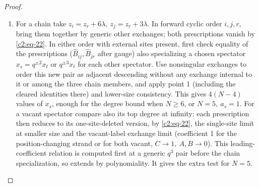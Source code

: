 \begin{proof}
\begin{enumerate}
\item For a chain take \(z_i=z_r+6\lambda,\ z_j=z_r+3\lambda\). In forward cyclic order \(i,j,r\), bring them together by generic other exchanges; both prescriptions vanish by \eqref{c2:eq-22}. In either order with external sites present, first check equality of the prescriptions (\(\widehat B_{ij},\widehat B_{jr}\) after gauge) also specializing a chosen spectator \(x_s=q^{\pm2}x_t\) or \(q^{\pm3}x_t\) for each other spectator. Use nonsingular exchanges to order this new pair as adjacent descending without any exchange internal to it or among the three chain members, and apply point 1 (including the cleared identities there) and lower-size consistency. This gives \(4(N-4)\) values of \(x_s\), enough for the degree bound when \(N\ge6\), or \(N=5,\ a_s=1\). For a vacant spectator compare also its top degree at infinity: each prescription then reduces to its one-site-deleted version, by \eqref{c2:eq-22}, the single-site limit at smaller size and the vacant-label exchange limit (coefficient 1 for the position-changing strand or for both vacant, \(C\to1,\ A,B\to0\)). This leading-coefficient relation is computed first at a generic \(q^3\) pair before the chain specialization, so extends by polynomiality. It gives the extra test for \(N=5\).

\end{enumerate}


\end{proof}
